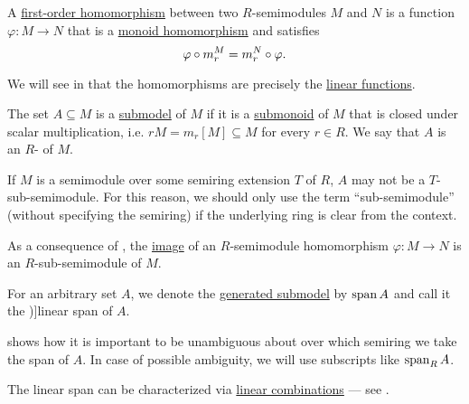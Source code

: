 \begin{definition}
\begin{thmenum}[resume=def:semimodule]
     A \hyperref[def:first_order_homomorphism]{first-order homomorphism} between two \( R \)-semimodules \( M \) and \( N \) is a function \( \varphi: M \to N \) that is a \hyperref[def:monoid/homomorphism]{monoid homomorphism} and satisfies
    \begin{equation}\label{eq:def:semimodule/homomorphism/compatibility}
      \varphi \bincirc m_r^M = m_r^N \bincirc \varphi.
    \end{equation}

    We will see in  that the homomorphisms are precisely the \hyperref[def:linear_function]{linear functions}.

     The set \( A \subseteq M \) is a \hyperref[def:first_order_submodel]{submodel} of \( M \) if it is a \hyperref[def:monoid/submodel]{submonoid} of \( M \) that is closed under scalar multiplication, i.e. \( rM = m_r[M] \subseteq M \) for every \( r \in R \). We say that \( A \) is an \( R \)- of \( M \).

    If \( M \) is a semimodule over some semiring extension \( T \) of \( R \), \( A \) may not be a \( T \)-sub-semimodule. For this reason, we should only use the term \enquote{sub-semimodule} (without specifying the semiring) if the underlying ring is clear from the context.

    As a consequence of , the \hyperref[def:set_valued_map/image]{image} of an \( R \)-semimodule homomorphism \( \varphi: M \to N \) is an \( R \)-sub-semimodule of \( M \).

    \mimprovised For an arbitrary set \( A \), we denote the \hyperref[def:first_order_generated_substructure]{generated submodel} by \( \operatorname{span}{ A } \) and call it the \term[ru=линейная оболочка (\cite[sec. 3.2]{Тыртышников2007ЛинейнаяАлгебра})]{linear span} of \( A \).

     shows how it is important to be unambiguous about over which semiring we take the span of \( A \). In case of possible ambiguity, we will use subscripts like \( \operatorname{span}_R A \).

    The linear span can be characterized via \hyperref[def:linear_combination]{linear combinations} --- see .


\end{thmenum}
\end{definition}
